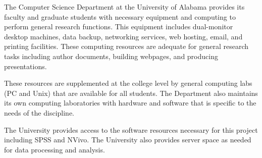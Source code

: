 The Computer Science Department at the University of Alabama provides its faculty and graduate students with necessary equipment and computing to perform general research functions. 
This equipment includes dual-monitor desktop machines, data backup, networking services, web hosting, email, and printing facilities.
These computing resources are adequate for general research tasks including author documents, building webpages, and producing presentations.

These resources are supplemented at the college level by general computing labs (PC and Unix) that are available for all students. 
The Department also maintains its own computing laboratories with hardware and software that is specific to the needs of the discipline. 

The University provides access to the software resources necessary for this project including SPSS and NVivo.
The University also provides server space as needed for data processing and analysis.
